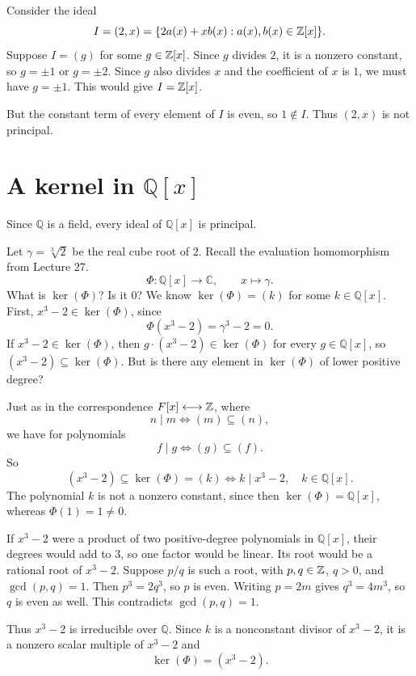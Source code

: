 \documentclass[reqno,11pt]{amsart}
\newcommand{\Q}{\mathbb{Q}}
\newcommand{\C}{\mathbb{C}}
\begin{document}
\begin{example}
Consider the ideal
\[
  I=(2,x)=\{2a(x)+xb(x):a(x),b(x)\in\mathbb{Z}[x]\}.
\]
Suppose $I=(g)$ for some $g\in\mathbb{Z}[x]$. Since $g$ divides $2$,
it is a nonzero constant, so $g=\pm1$ or $g=\pm2$. Since $g$
also divides $x$ and the coefficient of $x$ is $1$, we must have
$g=\pm1$. This would give $I=\mathbb{Z}[x]$.

But the constant term of every element of $I$ is even, so $1\notin I$.
Thus $(2,x)$ is not principal.
\end{example}

\section{A kernel in \texorpdfstring{$\Q[x]$}{Q[x]}}

Since $\Q$ is a field, every ideal of $\Q[x]$ is principal.

\begin{example}
Let $\gamma=\sqrt[3]{2}$ be the real cube root of $2$. Recall the
evaluation homomorphism from Lecture 27.
\[
  \Phi:\Q[x]\to\C,\qquad x\mapsto\gamma.
\]
What is $\ker(\Phi)$? Is it $0$? We know $\ker(\Phi)=(k)$ for
some $k\in\Q[x]$. First, $x^3-2\in\ker(\Phi)$, since
\[
  \Phi(x^3-2)=\gamma^3-2=0.
\]
If $x^3-2\in\ker(\Phi)$, then $g\cdot(x^3-2)\in\ker(\Phi)$
for every $g\in\Q[x]$, so $(x^3-2)\subseteq\ker(\Phi)$. But is
there any element in $\ker(\Phi)$ of lower positive degree?

Just as in the correspondence $F[x]\longleftrightarrow\mathbb{Z}$, where
\[
  n\mid m\iff(m)\subseteq(n),
\]
we have for polynomials
\[
  f\mid g\iff(g)\subseteq(f).
\]
So
\[
  (x^3-2)\subseteq\ker(\Phi)=(k)\iff k\mid x^3-2,\quad k\in\Q[x].
\]
The polynomial $k$ is not a nonzero constant, since then
$\ker(\Phi)=\Q[x]$, whereas $\Phi(1)=1\neq0$.

If $x^3-2$ were a product of two positive-degree polynomials in
$\Q[x]$, their degrees would add to $3$, so one factor would be
linear. Its root would be a rational root of $x^3-2$. Suppose
$p/q$ is such a root, with $p,q\in\mathbb{Z}$, $q>0$, and $\gcd(p,q)=1$.
Then $p^3=2q^3$, so $p$ is even. Writing $p=2m$ gives
$q^3=4m^3$, so $q$ is even as well. This contradicts $\gcd(p,q)=1$.

Thus $x^3-2$ is irreducible over $\Q$. Since $k$ is a nonconstant
divisor of $x^3-2$, it is a
nonzero scalar multiple of $x^3-2$ and
\[
  \ker(\Phi)=(x^3-2).
\]
\end{example}
\end{document}
